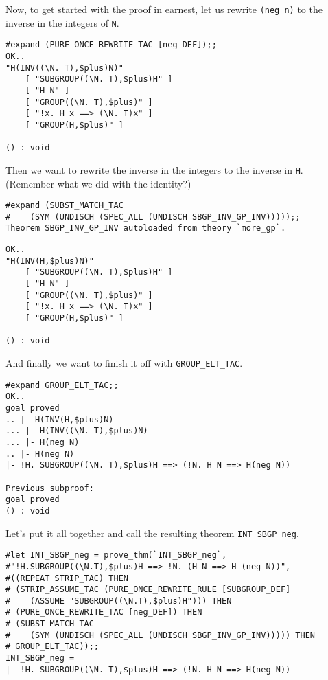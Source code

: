 Now, to get started with the proof in earnest, let us rewrite
{\small\verb+(neg n)+} to the inverse in the integers of
{\small\tt N}.
\begin{session}
\begin{verbatim}
#expand (PURE_ONCE_REWRITE_TAC [neg_DEF]);;
OK..
"H(INV((\N. T),$plus)N)"
    [ "SUBGROUP((\N. T),$plus)H" ]
    [ "H N" ]
    [ "GROUP((\N. T),$plus)" ]
    [ "!x. H x ==> (\N. T)x" ]
    [ "GROUP(H,$plus)" ]

() : void
\end{verbatim}
\end{session}
Then we want to rewrite the inverse in the integers to the inverse in
{\small\tt H}.  (Remember what we did with the identity?)
\begin{session}
\begin{verbatim}
#expand (SUBST_MATCH_TAC
#    (SYM (UNDISCH (SPEC_ALL (UNDISCH SBGP_INV_GP_INV)))));;
Theorem SBGP_INV_GP_INV autoloaded from theory `more_gp`.
\end{verbatim}
\mvdots
\begin{verbatim}
OK..
"H(INV(H,$plus)N)"
    [ "SUBGROUP((\N. T),$plus)H" ]
    [ "H N" ]
    [ "GROUP((\N. T),$plus)" ]
    [ "!x. H x ==> (\N. T)x" ]
    [ "GROUP(H,$plus)" ]

() : void
\end{verbatim}
\end{session}
And finally we want to finish it off with
{\small\verb+GROUP_ELT_TAC+}.
\begin{session}
\begin{verbatim}
#expand GROUP_ELT_TAC;;
OK..
goal proved
.. |- H(INV(H,$plus)N)
... |- H(INV((\N. T),$plus)N)
... |- H(neg N)
.. |- H(neg N)
|- !H. SUBGROUP((\N. T),$plus)H ==> (!N. H N ==> H(neg N))

Previous subproof:
goal proved
() : void
\end{verbatim}
\end{session}

Let's put it all together and call the resulting theorem
{\small\verb+INT_SBGP_neg+}.
\begin{session}
\begin{verbatim}
#let INT_SBGP_neg = prove_thm(`INT_SBGP_neg`,
#"!H.SUBGROUP((\N.T),$plus)H ==> !N. (H N ==> H (neg N))",
#((REPEAT STRIP_TAC) THEN
# (STRIP_ASSUME_TAC (PURE_ONCE_REWRITE_RULE [SUBGROUP_DEF]
#    (ASSUME "SUBGROUP((\N.T),$plus)H"))) THEN
# (PURE_ONCE_REWRITE_TAC [neg_DEF]) THEN
# (SUBST_MATCH_TAC
#    (SYM (UNDISCH (SPEC_ALL (UNDISCH SBGP_INV_GP_INV))))) THEN
# GROUP_ELT_TAC));;
INT_SBGP_neg = 
|- !H. SUBGROUP((\N. T),$plus)H ==> (!N. H N ==> H(neg N))
\end{verbatim}
\end{session}

